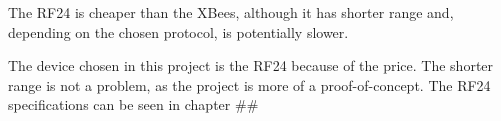 The RF24 is cheaper than the XBees, although it has shorter range and, depending on the chosen protocol, is potentially slower.


The device chosen in this project is the RF24 because of the price. The shorter range is not a problem, as the project is more of a proof-of-concept.
The RF24 specifications can be seen in chapter \#\#

